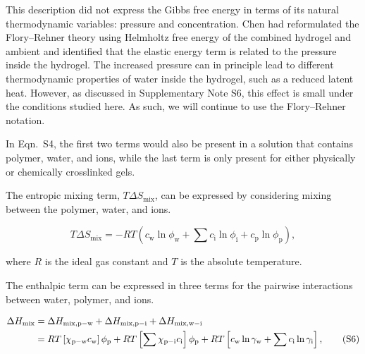 \documentclass[11pt]{article}
\begin{document}
This description did not express the Gibbs free energy in terms of its natural thermodynamic variables: pressure and concentration.\cite{chen2022} Chen had reformulated the Flory--Rehner theory using Helmholtz free energy of the combined hydrogel and ambient and identified that the elastic energy term is related to the pressure inside the hydrogel.\cite{chen2022} The increased pressure can in principle lead to different thermodynamic properties of water inside the hydrogel, such as a reduced latent heat.\cite{chen2022} However, as discussed in Supplementary Note S6, this effect is small under the conditions studied here. As such, we will continue to use the Flory--Rehner notation.\cite{flory1953}

In Eqn.~S4, the first two terms would also be present in a solution that contains polymer, water, and ions, while the last term is only present for either physically or chemically crosslinked gels.\cite{flory1953}

The entropic mixing term, $T\Delta S_\mathrm{mix}$, can be expressed by considering mixing between the polymer, water, and ions.\cite{atkins2006}

\begin{equation}
T\Delta S_\mathrm{mix} = -RT\left(c_\mathrm{w} \ln \phi_\mathrm{w} + \sum c_\mathrm{i} \ln \phi_\mathrm{i} + c_\mathrm{p} \ln \phi_\mathrm{p}\right), \tag{S5}
\end{equation}

where $R$ is the ideal gas constant and $T$ is the absolute temperature.

The enthalpic term can be expressed in three terms for the pairwise interactions between water, polymer, and ions.\cite{chen2022,flory1953,atkins2006}

\begin{align}
\Delta H_\mathrm{mix} &= \Delta H_\mathrm{mix,p-w} + \Delta H_\mathrm{mix,p-i} + \Delta H_\mathrm{mix,w-i} \notag\\
&= RT\left[\chi_\mathrm{p-w} c_\mathrm{w}\right]\phi_\mathrm{p} + RT\left[\sum \chi_\mathrm{p-i} c_\mathrm{i}\right]\phi_\mathrm{p} + RT\left[c_\mathrm{w} \ln \gamma_\mathrm{w} + \sum c_\mathrm{i} \ln \gamma_\mathrm{i}\right], \tag{S6}
\end{align}
\end{document}
